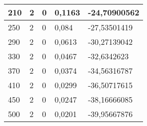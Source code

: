 \begin{table}[h!]
\begin{tabular}{l|l|l|l|l}
		\hline
		210 & 2 & 0 & 0,1163 & -24,70900562 \\
		\hline
		250 & 2 & 0 & 0,084 & -27,53501419 \\
		\hline
		290 & 2 & 0 & 0,0613 & -30,27139042 \\
		\hline
		330 & 2 & 0 & 0,0467 & -32,6342623 \\
		\hline
		370 & 2 & 0 & 0,0374 & -34,56316787 \\
		\hline
		410 & 2 & 0 & 0,0299 & -36,50717615 \\
		\hline
		450 & 2 & 0 & 0,0247 & -38,16666085 \\
		\hline
		500 & 2 & 0 & 0,0201 & -39,95667876
	\end{tabular}
\end{table}